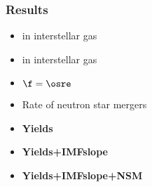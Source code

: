 \setlength{\subfigwidth}{0.4\textwidth} %
\setlength{\figwidth}{0.5\textwidth} %
\newcommand\MCEdir[1]{../thesis/results/MCExperiment_revised_2/#1}
\newcommand\MCEdelmaxdir[1]{../thesis/results/MCExperiment_revised_2_delmax/#1}
\newcommand\MCEimfslopedir[1]{../thesis/results/MCExperiment_revised_2_imfslope/#1}
\newcommand\MCEnumnsmdir[1]{../thesis/results/MCExperiment_revised_2_numnsm/#1}

\begin{frame}
\frametitle{Results}
\begin{itemize}
\item {} in interstellar gas
\item {} in interstellar gas
\item $\f = \osre$
\item Rate of neutron star mergers
\end{itemize}
\begin{itemize}
\item \textbf{Yields}
\item \textbf{Yields+IMFslope}
\item \textbf{Yields+IMFslope+NSM}
\end{itemize}
\end{frame}

